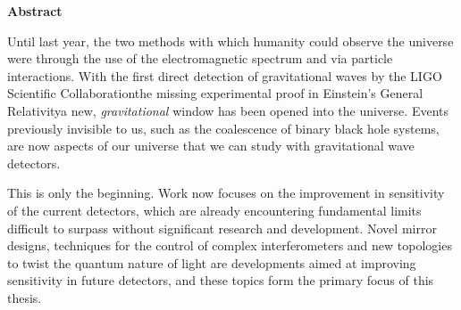 \vspace*{1.75in}
\begin{center} {\bf Abstract}\end{center}

Until last year, the two methods with which humanity could observe the universe were through the use of the electromagnetic spectrum and via particle interactions. With the first direct detection of gravitational waves by the LIGO Scientific Collaboration\textemdash the missing experimental proof in Einstein's General Relativity\textemdash a new, \emph{gravitational} window has been opened into the universe. Events previously invisible to us, such as the coalescence of binary black hole systems, are now aspects of our universe that we can study with gravitational wave detectors.

This is only the beginning. Work now focuses on the improvement in sensitivity of the current detectors, which are already encountering fundamental limits difficult to surpass without significant research and development. Novel mirror designs, techniques for the control of complex interferometers and new topologies to twist the quantum nature of light are developments aimed at improving sensitivity in future detectors, and these topics form the primary focus of this thesis.

